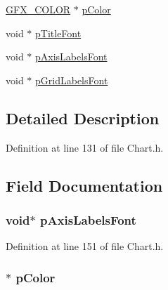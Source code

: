 \begin{DoxyCompactItemize}
\item 
\hyperlink{gfxcolors_8h_a0658edb6e7bd88d6e9a185711893441c}{G\+F\+X\+\_\+\+C\+O\+L\+O\+R} $\ast$ \hyperlink{struct_c_h_a_r_t_p_a_r_a_m_a32b85de5a5c8d71aadbd446a0ad59002}{p\+Color}
\item 
void $\ast$ \hyperlink{struct_c_h_a_r_t_p_a_r_a_m_afd3139e482e6e0036da7aa3232ac977b}{p\+Title\+Font}
\item 
void $\ast$ \hyperlink{struct_c_h_a_r_t_p_a_r_a_m_a004fdba98015ac1de03d525fc8e3c601}{p\+Axis\+Labels\+Font}
\item 
void $\ast$ \hyperlink{struct_c_h_a_r_t_p_a_r_a_m_a4289b3bc044a5232933eb543e314d1b7}{p\+Grid\+Labels\+Font}
\end{DoxyCompactItemize}


\subsection{Detailed Description}


Definition at line 131 of file Chart.\+h.



\subsection{Field Documentation}
\hypertarget{struct_c_h_a_r_t_p_a_r_a_m_a004fdba98015ac1de03d525fc8e3c601}{}
\subsubsection[{p\+Axis\+Labels\+Font}]{\setlength{\rightskip}{0pt plus 5cm}void$\ast$ p\+Axis\+Labels\+Font}\label{struct_c_h_a_r_t_p_a_r_a_m_a004fdba98015ac1de03d525fc8e3c601}


Definition at line 151 of file Chart.\+h.

\hypertarget{struct_c_h_a_r_t_p_a_r_a_m_a32b85de5a5c8d71aadbd446a0ad59002}{}
\subsubsection[{p\+Color}]{$\ast$ p\+Color}\label{struct_c_h_a_r_t_p_a_r_a_m_a32b85de5a5c8d71aadbd446a0ad59002}


